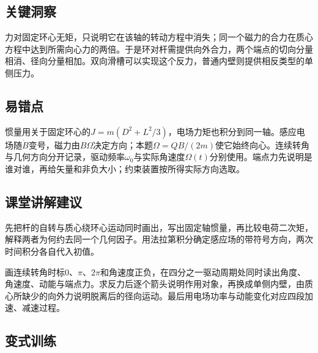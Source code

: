 \documentclass[UTF8,fontset=fandol,a4paper,11pt]{ctexart}
\begin{document}


\subsection*{关键洞察}

力对固定环心无矩，只说明它在该轴的转动方程中消失；同一个磁力的合力在质心方程中达到所需向心力的两倍。于是环对杆需提供向外合力，两个端点的切向分量相消、径向分量相加。双向滑槽可以实现这个反力，普通内壁则提供相反类型的单侧压力。



\subsection*{易错点}

惯量用关于固定环心的$J=m(D^2+L^2/3)$，电场力矩也积分到同一轴。感应电场随$\dot B$变号，磁力由$B\Omega$决定方向；本题$\Omega=QB/(2m)$使它始终向心。连续转角与几何方向分开记录，驱动频率$\omega_0$与实际角速度$\Omega(t)$分别使用。端点力先说明是谁对谁，再给矢量和非负大小；约束装置按所得实际方向选取。



\subsection*{课堂讲解建议}

先把杆的自转与质心绕环心运动同时画出，写出固定轴惯量，再比较电荷二次矩，解释两者为何约去同一个几何因子。用法拉第积分确定感应场的带符号方向，两次时间积分各自代入初值。

画连续转角时标0、$\pi$、$2\pi$和角速度正负，在四分之一驱动周期处同时读出角度、角速度、动能与端点力。求反力后逐个箭头说明作用对象，再换成单侧内壁，由质心所缺少的向外力说明脱离后的径向运动。最后用电场功率与动能变化对应四段加速、减速过程。



\subsection*{变式训练}
\end{document}
